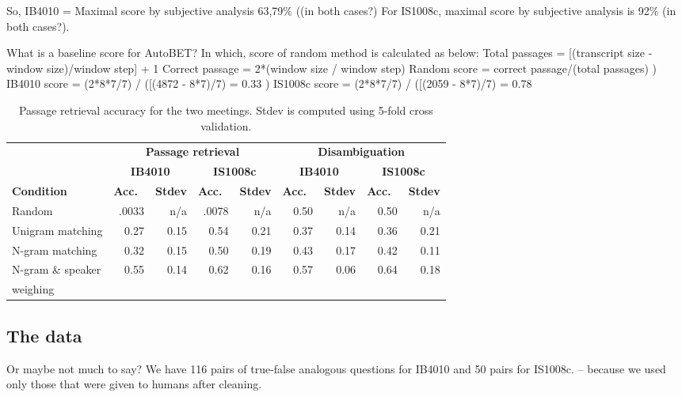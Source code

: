\documentclass[11pt]{article}
\begin{document}
So, IB4010 = Maximal score by subjective analysis 63,79\% ((in both cases?)
For IS1008c, maximal score by subjective analysis is 92\% (in both cases?).

What is a baseline score for AutoBET?
In which, score of random method is calculated as below:
Total passages = [(transcript size - window size)/window step] + 1
Correct passage = 2*(window size / window step)
Random score = correct passage/(total passages)
) IB4010 score = (2*8*7/7) / ([(4872 - 8*7)/7) = 0.33
) IS1008c score = (2*8*7/7) / ([(2059 - 8*7)/7) = 0.78


\begin{table*}
\begin{center}
\begin{tabular}{|l|rr|rr||rr|rr|}
\hline
			& \multicolumn{4}{c||}{\textbf{Passage retrieval}} & \multicolumn{4}{c|}{\textbf{Disambiguation}} \\
 			& \multicolumn{2}{c|}{\textbf{IB4010}} 	& \multicolumn{2}{c||}{\bf IS1008c} & \multicolumn{2}{c|}{\textbf{IB4010}} 	& \multicolumn{2}{c|}{\bf IS1008c} \\
\bf Condition				&\bf Acc.\ &\bf Stdev& \bf Acc.\ &\bf Stdev &\bf Acc.\ &\bf Stdev &\bf Acc.\ &\bf Stdev \\  
\hline
Random 							& .0033 	& n/a 				& .0078 	& n/a 		& 0.50 		& n/a 			& 0.50 		& n/a\\
Unigram matching 		& 0.27		& 0.15 				& 0.54 		& 0.21 		& 0.37		& 0.14 			& 0.36 		& 0.21\\
N-gram matching 		& 0.32 		& 0.15				& 0.50		& 0.19 		& 0.43 		& 0.17			& 0.42		& 0.11\\
N-gram \& speaker 	& 0.55		& 0.14				& 0.62		& 0.16 		& 0.57		& 0.06			& 0.64		& 0.18\\
weighing & & & & & & & &\\
\hline
\end{tabular}
\end{center}
\caption{\label{tab:autobet-scores} Passage retrieval accuracy for the two meetings.  Stdev is computed using 5-fold cross validation.}
\end{table*}


\subsection{The data}

Or maybe not much to say? We have 116 pairs of true-false analogous questions for IB4010
and 50 pairs for IS1008c. -- because we used only those that were given to humans after cleaning.
\end{document}
